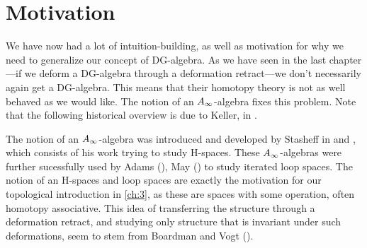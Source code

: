 






\section{Motivation}

We have now had a lot of intuition-building, as well as motivation for why we need to generalize our concept of DG-algebra. As we have seen in the last chapter---if we deform a DG-algebra through a deformation retract---we don't necessarily again get a DG-algebra. This means that their homotopy theory is not as well behaved as we would like. The notion of an $A_{\infty}$-algebra fixes this problem. Note that the following historical overview is due to Keller, in \cite{keller}.

The notion of an $A_{\infty}$-algebra was introduced and developed by Stasheff in \cite{h-spaces1} and \cite{h-spaces2}, which consists of his work trying to study H-spaces. These $A_{\infty}$-algebras were further sucessfully used by Adams (\cite{adams_loop}), May (\cite{may_loop}) to study iterated loop spaces. The notion of an H-spaces and loop spaces are exactly the motivation for our topological introduction in \cref{ch:3}, as these are spaces with some operation, often homotopy associative. This idea of transferring the structure through a deformation retract, and studying only structure that is invariant under such deformations, seem to stem from Boardman and Vogt (\cite{boardman_vogt}). 

